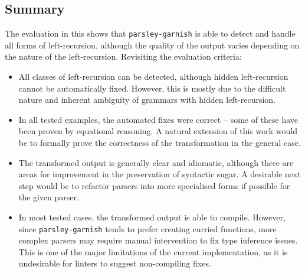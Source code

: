 \documentclass[../../main.tex]{subfiles}
\begin{document}
\subsection*{Summary}
The evaluation in this  shows that \texttt{parsley-garnish} is able to detect and handle all forms of left-recursion, although the quality of the output varies depending on the nature of the left-recursion.
Revisiting the evaluation criteria:
\begin{itemize}
  \item All classes of left-recursion can be detected, although hidden left-recursion cannot be automatically fixed. However, this is mostly due to the difficult nature and inherent ambiguity of grammars with hidden left-recursion.
  \item In all tested examples, the automated fixes were correct -- some of these have been proven by equational reasoning. A natural extension of this work would be to formally prove the correctness of the transformation in the general case.
  \item The transformed output is generally clear and idiomatic, although there are areas for improvement in the preservation of syntactic sugar. A desirable next step would be to refactor  parsers into more specialised forms if possible for the given parser.
  \item In most tested cases, the transformed output is able to compile. However, since \texttt{parsley-garnish} tends to prefer creating curried functions, more complex parsers may require manual intervention to fix type inference issues. This is one of the major limitations of the current implementation, as it is undesirable for linters to suggest non-compiling fixes.
\end{itemize}




\end{document}
